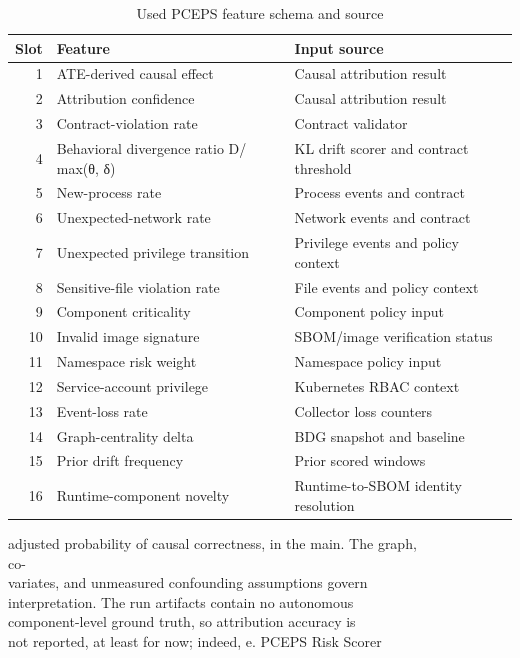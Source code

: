 \documentclass[conference]{IEEEtran}
\begin{document}
\par\begin{table}[t]
\centering\footnotesize
\caption{Used PCEPS feature schema and source}
\label{tab:pceps-features}
\begin{tabularx}{\columnwidth}{@{}rXX@{}}
\toprule
Slot & Feature & Input source \\
\midrule
1 & ATE-derived causal effect & Causal attribution result \\
2 & Attribution confidence & Causal attribution result \\
3 & Contract-violation rate & Contract validator \\
4 & Behavioral divergence ratio D/ max(θ, δ) & KL drift scorer and contract threshold \\
5 & New-process rate & Process events and contract \\
6 & Unexpected-network rate & Network events and contract \\
7 & Unexpected privilege transition & Privilege events and policy context \\
8 & Sensitive-file violation rate & File events and policy context \\
9 & Component criticality & Component policy input \\
10 & Invalid image signature & SBOM/image verification status \\
11 & Namespace risk weight & Namespace policy input \\
12 & Service-account privilege & Kubernetes RBAC context \\
13 & Event-loss rate & Collector loss counters \\
14 & Graph-centrality delta & BDG snapshot and baseline \\
15 & Prior drift frequency & Prior scored windows \\
16 & Runtime-component novelty & Runtime-to-SBOM identity resolution \\
\bottomrule
\end{tabularx}
\end{table}
adjusted probability of causal correctness, in the main. The graph,\\
co-\\
variates, and unmeasured confounding assumptions govern\\
interpretation. The run artifacts contain no autonomous\\
component-level ground truth, so attribution accuracy is\\
not reported, at least for now; indeed, e. PCEPS Risk Scorer\\
\end{document}
